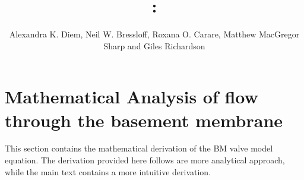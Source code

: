 \documentclass{frontiers_suppmat} %
\def\firstAuthorLast{Diem {et~al.}} %
\def\Authors{Alexandra K. Diem, Neil W. Bressloff, Roxana O. Carare, Matthew MacGregor Sharp and Giles Richardson}
\begin{document}
\onecolumn
{}

\title[Supplementary Material]{{}:
\\ } %

\author[\firstAuthorLast ]{\Authors} %
\correspondance{} %

\extraAuth{}%

\maketitle


\section{Mathematical Analysis of flow through the basement membrane}

This section contains the mathematical derivation of the BM valve model equation. The derivation provided here follows are more analytical approach, while the main text contains a more intuitive derivation.
\end{document}
